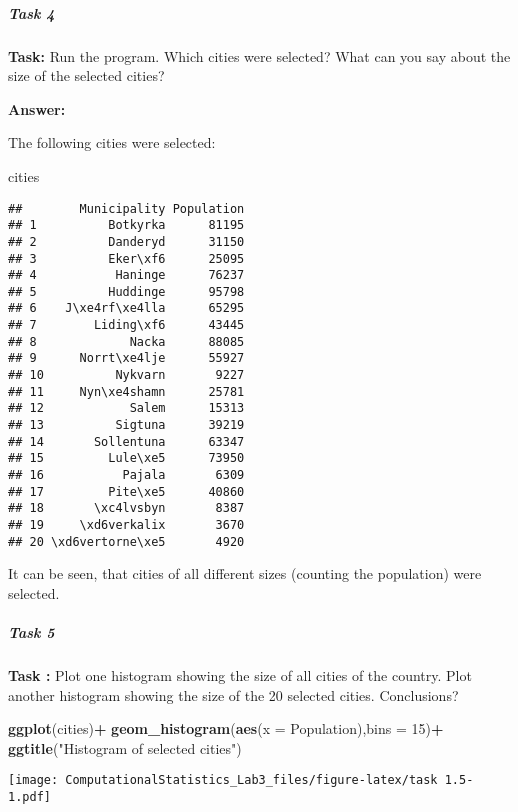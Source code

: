 \documentclass[]{article}
\newenvironment{Shaded}{\begin{snugshade}}{\end{snugshade}}
\newcommand{\KeywordTok}[1]{\textcolor[rgb]{0.13,0.29,0.53}{\textbf{#1}}}
\newcommand{\DataTypeTok}[1]{\textcolor[rgb]{0.13,0.29,0.53}{#1}}
\newcommand{\DecValTok}[1]{\textcolor[rgb]{0.00,0.00,0.81}{#1}}
\newcommand{\StringTok}[1]{\textcolor[rgb]{0.31,0.60,0.02}{#1}}
\newcommand{\OperatorTok}[1]{\textcolor[rgb]{0.81,0.36,0.00}{\textbf{#1}}}
\newcommand{\NormalTok}[1]{#1}
\let\oldsubparagraph\subparagraph
\renewcommand{\subparagraph}[1]{\oldsubparagraph{#1}\mbox{}}
\begin{document}
\subparagraph{Task 4}\label{task-4}

\textbf{Task:} Run the program. Which cities were selected? What can you
say about the size of the selected cities?

\textbf{Answer:}

The following cities were selected:

\begin{Shaded}
\begin{Highlighting}[]
\NormalTok{cities}
\end{Highlighting}
\end{Shaded}

\begin{verbatim}
##        Municipality Population
## 1          Botkyrka      81195
## 2          Danderyd      31150
## 3          Eker\xf6      25095
## 4           Haninge      76237
## 5          Huddinge      95798
## 6    J\xe4rf\xe4lla      65295
## 7        Liding\xf6      43445
## 8             Nacka      88085
## 9      Norrt\xe4lje      55927
## 10          Nykvarn       9227
## 11     Nyn\xe4shamn      25781
## 12            Salem      15313
## 13          Sigtuna      39219
## 14       Sollentuna      63347
## 15         Lule\xe5      73950
## 16           Pajala       6309
## 17         Pite\xe5      40860
## 18       \xc4lvsbyn       8387
## 19     \xd6verkalix       3670
## 20 \xd6vertorne\xe5       4920
\end{verbatim}

It can be seen, that cities of all different sizes (counting the
population) were selected.

\subparagraph{Task 5}\label{task-5}

\textbf{Task :} Plot one histogram showing the size of all cities of the
country. Plot another histogram showing the size of the 20 selected
cities. Conclusions?

\begin{Shaded}
\begin{Highlighting}[]
\KeywordTok{ggplot}\NormalTok{(cities)}\OperatorTok{+}
\StringTok{  }\KeywordTok{geom_histogram}\NormalTok{(}\KeywordTok{aes}\NormalTok{(}\DataTypeTok{x =}\NormalTok{ Population),}\DataTypeTok{bins =} \DecValTok{15}\NormalTok{)}\OperatorTok{+}
\StringTok{  }\KeywordTok{ggtitle}\NormalTok{(}\StringTok{"Histogram of selected cities"}\NormalTok{)}
\end{Highlighting}
\end{Shaded}

\texttt{[image: ComputationalStatistics\_Lab3\_files/figure-latex/task 1.5-1.pdf]}
\end{document}
